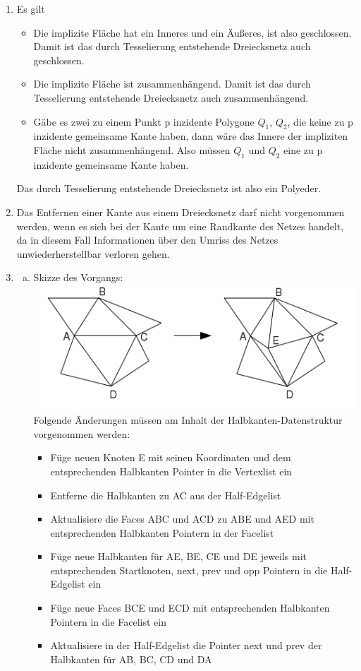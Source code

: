 \documentclass[a4paper,10pt]{scrartcl}
\begin{document}
\vspace*{5pt}
\begin{enumerate}[1.]

\item Es gilt
 \begin{itemize}
  \item Die implizite Fläche hat ein Inneres und ein Äußeres, ist also geschlossen. Damit ist das durch Tesselierung entstehende Dreiecksnetz auch geschlossen.
  \item Die implizite Fläche ist zusammenhängend. Damit ist das durch Tesselierung entstehende Dreiecksnetz auch zusammenhängend.
  \item Gäbe es zwei zu einem Punkt p inzidente Polygone $Q_1$, $Q_2$, die keine zu p inzidente gemeinsame Kante haben, dann wäre das Innere der impliziten Fläche nicht zusammenhängend. Also müssen $Q_1$ und $Q_2$ eine zu p inzidente gemeinsame Kante haben.
 \end{itemize}
Das durch Tesselierung entstehende Dreiecksnetz ist also ein Polyeder.

\item Das Entfernen einer Kante aus einem Dreiecksnetz darf nicht vorgenommen werden, wenn es sich bei der Kante um eine Randkante des Netzes handelt, da in diesem Fall Informationen über den Umriss des Netzes unwiederherstellbar verloren gehen.

\item
 \begin{enumerate}[a.]
  \item Skizze des Vorgangs:\\
  \includegraphics[scale=0.6]{cg2_ex4_3a.png}\\
  Folgende Änderungen müssen am Inhalt der Halbkanten-Datenstruktur vorgenommen werden:
  \begin{itemize}
   \item Füge neuen Knoten E mit seinen Koordinaten und dem entsprechenden Halbkanten Pointer in die Vertexlist ein
   \item Entferne die Halbkanten zu AC aus der Half-Edgelist
   \item Aktualisiere die Faces ABC und ACD zu ABE und AED mit entsprechenden Halbkanten Pointern in der Facelist
   \item Füge neue Halbkanten für AE, BE, CE und DE jeweils mit entsprechenden Startknoten, next, prev und opp Pointern in die Half-Edgelist ein
   \item Füge neue Faces BCE und ECD mit entsprechenden Halbkanten Pointern in die Facelist ein
   \item Aktualisiere in der Half-Edgelist die Pointer next und prev der Halbkanten für AB, BC, CD und DA
  \end{itemize}


\end{enumerate}
\end{enumerate}
\end{document}
